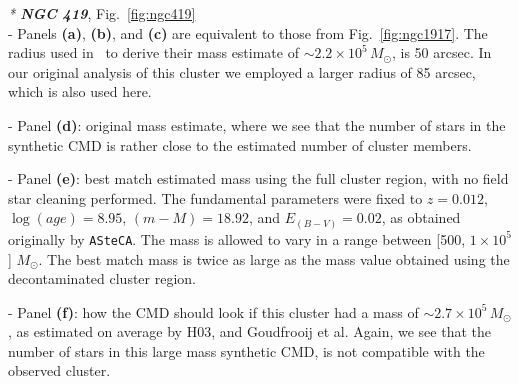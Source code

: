 \documentclass{article}
\begin{document}
%
%


\noindent \emph{* \textbf{NGC 419}}, Fig.~\ref{fig:ngc419}\\

\noindent - Panels \textbf{(a)}, \textbf{(b)}, and \textbf{(c)} are equivalent
to those from Fig.~\ref{fig:ngc1917}.
The radius used in~\cite{Goudfrooij_2014} to derive their mass estimate of
${\sim}2.2{\times}10^5\,M_{\odot}$, is 50 arcsec. In our original analysis of
this cluster we employed a larger radius of 85 arcsec, which is also
used here.

\noindent - Panel \textbf{(d)}: original mass estimate, where we see
that the number of stars in the synthetic CMD is rather close to the estimated
number of cluster members.

\noindent - Panel \textbf{(e)}: best match estimated mass using
the full cluster region, with no field star cleaning performed. The fundamental
parameters were fixed to $z{=}0.012$, $\log(age){=}8.95$, $(m-M){=}18.92$, and
$E_{(B-V)}{=}0.02$, as obtained originally by \texttt{ASteCA}. The mass is
allowed to vary in a range between [500, $1{\times}10^5$] $M_{\odot}$. The best
match mass is twice as large as the mass value obtained using the decontaminated
cluster region.

\noindent - Panel \textbf{(f)}: how the CMD should look if
this cluster had a mass of ${\sim}2.7{\times}10^5\,M_{\odot}$, as estimated on
average by H03, and Goudfrooij et al.
Again, we see that the number of stars in this large mass synthetic CMD, is
not compatible with the observed cluster.\\

%
%
\end{document}
